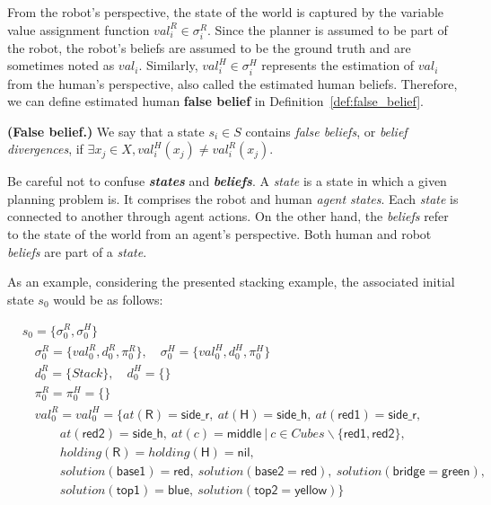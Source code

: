 From the robot's perspective, the state of the world is captured by the variable value assignment function $val^R_i \in \sigma^{R}_i$. Since the planner is assumed to be part of the robot, the robot's beliefs are assumed to be the ground truth and are sometimes noted as $val_i$. 
Similarly, $val^H_i \in \sigma^{H}_i$ represents the estimation of $val_i$ from the human's perspective, also called the estimated human beliefs. 
Therefore, we can define estimated human \textbf{false belief} in Definition~\ref{def:false_belief}.

\begin{definition}
    \textbf{(False belief.)} We say that a state $s_i \in S$ contains \emph{false beliefs}, or \emph{belief divergences}, if $\exists x_j \in X, val^H_i(x_j) \neq val^R_i(x_j)$. 
    \label{def:false_belief}
\end{definition}


Be careful not to confuse \textbf{\textit{states}} and \textbf{\textit{beliefs}}. A \textit{state} is a state in which a given planning problem is. It comprises the robot and human \textit{agent states}. Each \textit{state} is connected to another through agent actions. On the other hand, the \textit{beliefs} refer to the state of the world from an agent's perspective. Both human and robot \textit{beliefs} are part of a \textit{state}.



As an example, considering the presented stacking example, the associated initial state $s_0$ would be as follows: 

{\small
\begin{align*}
&s_0 = \{\sigma^R_0, \sigma^H_0\} \\
&\quad \sigma^R_0 = \{ val^R_0, d^R_0, \pi^R_0 \}, \quad \sigma^H_0 = \{ val^H_0, d^H_0, \pi^H_0 \} \\
&\quad d^R_0 = \{ Stack \}, \quad d^H_0 = \{  \} \\
&\quad \pi^R_0 = \pi^H_0 = \{  \} \\
&\quad val^R_0 = val^H_0 = \{at(\textsf{R}) = \textsf{side\_r},~at(\textsf{H}) = \textsf{side\_h}, ~at(\textsf{red1}) = \textsf{side\_r}, \\
&\quad \quad \quad at(\textsf{red2}) = \textsf{side\_h}, ~at(c) = \textsf{middle} ~|~ c \in Cubes\backslash\{ \textsf{red1}, \textsf{red2} \}, \\
&\quad \quad \quad holding(\textsf{R}) = holding(\textsf{H}) = \textsf{nil}, \\
&\quad \quad \quad solution(\textsf{base1}) = \textsf{red}, ~solution(\textsf{base2} = \textsf{red}), ~solution(\textsf{bridge} = \textsf{green}),   \\
&\quad \quad \quad solution(\textsf{top1}) = \textsf{blue}, ~solution(\textsf{top2} = \textsf{yellow}) \}  \\
\end{align*}
}

